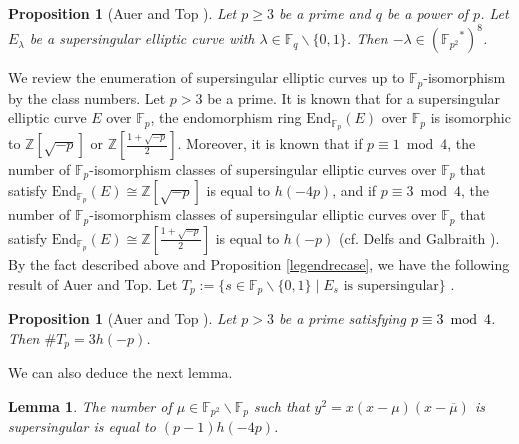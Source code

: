 \documentclass[10pt,a4paper]{amsart}
\theoremstyle{plain}
\newtheorem{prop}[defn]{Proposition}
\newtheorem{lem}[defn]{Lemma}
\newcommand{\lm}{\lambda}
\newcommand{\fp}{\mathbb{F}_p}
\newcommand{\fpp}{\mathbb{F}_{p^2}}
\newcommand{\fq}{\mathbb{F}_q}
\newcommand{\bZ}{\mathbb{Z}}
\begin{document}
\begin{prop}[Auer and Top {\cite[Proposition 3.2.]{AT02}}]
\label{propfpp8}
     Let $p \ge 3$ be a prime and $q$ be a power of $p$. Let $E_{\lm}$ be a supersingular elliptic curve with $\lm \in \fq \smallsetminus \{0,1 \}$. Then $-\lm \in \left( {{\mathbb{F}}_{p^2}}^{*}\right) ^8$.
\end{prop}

We review the enumeration of supersingular elliptic curves up to $\fp$-isomorphism by the class numbers. Let $p>3$ be a prime. It is known that for a supersingular elliptic curve $E$ over $\fp$, the endomorphism ring ${\textrm{End}}_{\fp}(E)$ over $\fp$ is isomorphic to $\bZ[\sqrt{-p}] $ or $\bZ \left[\frac{1+\sqrt{-p}}{2} \right]$. Moreover, it is known that if $p \equiv 1 \bmod 4$, the number of $\fp$-isomorphism classes of supersingular elliptic curves over $\fp$ that satisfy 
${\textrm{End}}_{\fp}(E) \cong \bZ[\sqrt{-p}] $ is equal to $h(-4p)$, and if $p \equiv 3 \bmod 4$, the number of $\fp$-isomorphism classes of supersingular elliptic curves over $\fp$ that satisfy ${\textrm{End}}_{\fp}(E) \cong \bZ \left[\frac{1+\sqrt{-p}}{2} \right]$ is equal to $ h(-p)$ (cf. Delfs and Galbraith \cite[Theorem 2.1, Theorem 2.7]{DG02}).
\\

By the fact described above and Proposition \ref{legendrecase}, we have the following result of Auer and Top.
Let $T_p:=\{ s \in \fp\smallsetminus\{0,1 \} \mid E_s\text{ is supersingular} \}$ .

\begin{prop}[Auer and Top {\cite[Proposition 3.2.]{AT02}}]
\label{numtp}
    Let $p>3$ be a prime satisfying \textcolor{black}{$ p \equiv 3 \bmod 4$}. Then $\# T_p=3h(-p)$.     
\end{prop}

We can also deduce the next lemma.

\begin{lem}\label{spsub}
The number of $\mu \in  \fpp \smallsetminus \fp$
such that $y^2=x(x-\mu)(x-\overline{\mu})$ is supersingular is equal to $(p-1)h(-4p)$.
\end{lem}
\end{document}
